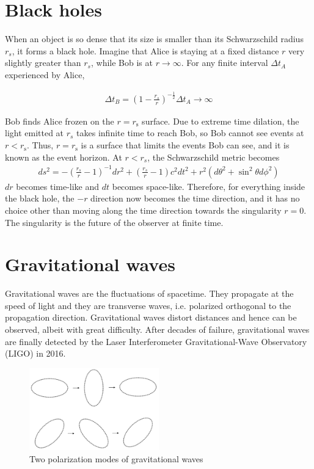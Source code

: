 \documentclass[12pt]{book} %
\numberwithin{equation}{chapter}
\def\D{\Delta}
\begin{document}
\section{Black holes}
When an object is so dense that its size is smaller than its Schwarzschild radius $r_{s}$, it forms a black hole. Imagine that Alice is staying at a fixed distance $r$ very slightly greater than $r_{s}$, while Bob is at $r\to\infty$. For any finite interval $\D t_{A}$ experienced by Alice, 
\begin{eqnbox}
\begin{align}
\D t_{B}={\left(1-\frac{r_{s}}{r}\right)}^{-\frac{1}{2}}\D t_{A}\to\infty
\end{align}
\end{eqnbox}
Bob finds Alice frozen on the $r=r_{\text{s}}$ surface. Due to extreme time dilation, the light emitted at $r_{s}$ takes infinite time to reach Bob, so Bob cannot see events at $r<r_{\text{s}}$. Thus, $r=r_{\text{s}}$ is a surface that limits the events Bob can see, and it is known as the event horizon.\bigskip\newline
At $r<r_{s}$, the Schwarzschild metric becomes
\begin{align}
ds^2=-{\left(\frac{r_{s}}{r}-1\right)}^{-1}dr^2 +\left(\frac{r_{s}}{r}-1\right)c^2 dt^2+r^2 \left(d\theta^{2}+\sin^{2}\theta d\phi^{2}\right)\nonumber
\end{align}
$dr$ becomes time-like and $dt$ becomes space-like. Therefore, for everything inside the black hole, the $-r$ direction now becomes the time direction, and it has no choice other than moving along the time direction towards the singularity $r=0$. The singularity is the future of the observer at finite time.

\section{Gravitational waves}
Gravitational waves are the fluctuations of spacetime. They propagate at the speed of light and they are transverse waves, i.e. polarized orthogonal to the propagation direction.\bigskip\newline
Gravitational waves distort distances and hence can be observed, albeit with great difficulty. After decades of failure, gravitational waves are finally detected by the Laser Interferometer Gravitational-Wave Observatory (LIGO) in 2016. 
\begin{figure}[H]
\centering
\includegraphics[width=0.5\textwidth]{Gravitational waves}
\caption{Two polarization modes of gravitational waves}
\end{figure}
\end{document}

